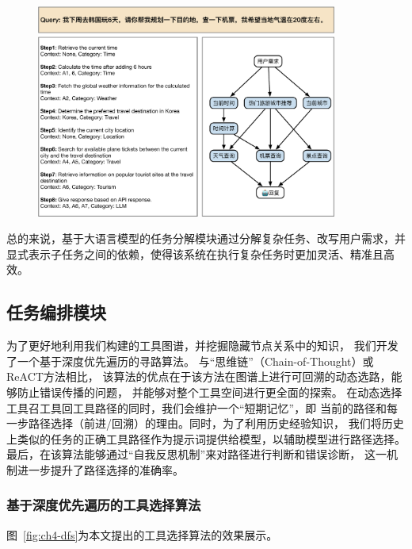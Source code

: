 \begin{figure}[!htp]
  \vspace{1em}
  \centering
  \setlength{\abovecaptionskip}{10pt} %
  \includegraphics[height=7cm]{../assets/ch4-任务分解模块.pdf}
  \label{fig:ch4-decomposition}
\end{figure}

总的来说，基于大语言模型的任务分解模块通过分解复杂任务、改写用户需求，并显式表示子任务之间的依赖，使得该系统在执行复杂任务时更加灵活、精准且高效。

\subsection{任务编排模块}

为了更好地利用我们构建的工具图谱，并挖掘隐藏节点关系中的知识，
我们开发了一个基于深度优先遍历的寻路算法。
与“思维链”（Chain-of-Thought）或ReACT方法相比，
该算法的优点在于该方法在图谱上进行可回溯的动态选路，能够防止错误传播的问题，
并能够对整个工具空间进行更全面的探索。
在动态选择工具召工具回工具路径的同时，我们会维护一个“短期记忆”，即
当前的路径和每一步路径选择（前进/回溯）的理由。同时，为了利用历史经验知识，
我们将历史上类似的任务的正确工具路径作为提示词提供给模型，以辅助模型进行路径选择。
最后，在该算法能够通过“自我反思机制”来对路径进行判断和错误诊断，
这一机制进一步提升了路径选择的准确率。

\subsubsection{基于深度优先遍历的工具选择算法}

图~\ref{fig:ch4-dfs}为本文提出的工具选择算法的效果展示。

